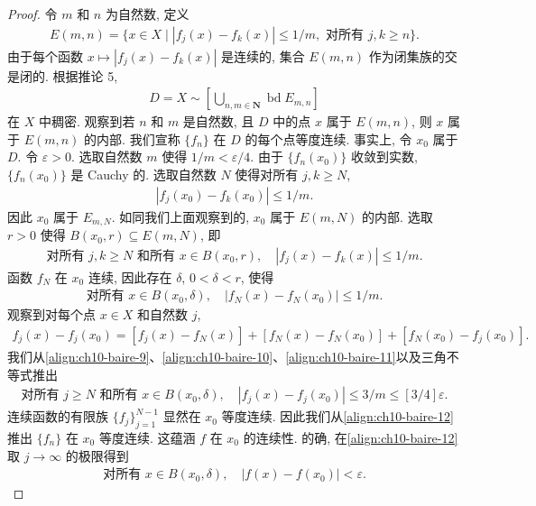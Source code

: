 \documentclass[../../main.tex]{subfiles}
\begin{document}
\begin{proof}
令 $m$ 和 $n$ 为自然数, 定义
\begin{align*}
E(m,n)=\{x\in X\mid|f_{j}(x)-f_{k}(x)|\leqslant 1/m,\text{ 对所有 }j,k\geqslant n\}.
\end{align*}
由于每个函数 $x\mapsto|f_{j}(x)-f_{k}(x)|$ 是连续的, 集合 $E(m,n)$ 作为闭集族的交是闭的. 根据推论 5,
\begin{align*}
D=X\sim\left[\bigcup_{n,m\in\mathbf{N}}\operatorname{bd}E_{m,n}\right]
\end{align*}
在 $X$ 中稠密. 观察到若 $n$ 和 $m$ 是自然数, 且 $D$ 中的点 $x$ 属于 $E(m,n)$, 则 $x$ 属于 $E(m,n)$ 的内部. 我们宣称 $\{f_{n}\}$ 在 $D$ 的每个点等度连续. 事实上, 令 $x_{0}$ 属于 $D$. 令 $\varepsilon>0$. 选取自然数 $m$ 使得 $1/m<\varepsilon/4$. 由于 $\{f_{n}(x_{0})\}$ 收敛到实数, $\{f_{n}(x_{0})\}$ 是 Cauchy 的. 选取自然数 $N$ 使得对所有 $j,k\geqslant N$,
\begin{align}
|f_{j}(x_{0})-f_{k}(x_{0})|\leqslant 1/m.\label{align:ch10-baire-9}
\end{align}
因此 $x_{0}$ 属于 $E_{m,N}$. 如同我们上面观察到的, $x_{0}$ 属于 $E(m,N)$ 的内部. 选取 $r>0$ 使得 $B(x_{0},r)\subseteq E(m,N)$, 即
\begin{align}
\text{对所有 }j,k\geqslant N\text{ 和所有 }x\in B(x_{0},r),\quad|f_{j}(x)-f_{k}(x)|\leqslant 1/m.\label{align:ch10-baire-10}
\end{align}
函数 $f_{N}$ 在 $x_{0}$ 连续, 因此存在 $\delta$, $0<\delta<r$, 使得
\begin{align}
\text{对所有 }x\in B(x_{0},\delta),\quad|f_{N}(x)-f_{N}(x_{0})|\leqslant 1/m.\label{align:ch10-baire-11}
\end{align}
观察到对每个点 $x\in X$ 和自然数 $j$,
\begin{align*}
f_{j}(x)-f_{j}(x_{0})=[f_{j}(x)-f_{N}(x)]+[f_{N}(x)-f_{N}(x_{0})]+[f_{N}(x_{0})-f_{j}(x_{0})].
\end{align*}
我们从\eqref{align:ch10-baire-9}、\eqref{align:ch10-baire-10}、\eqref{align:ch10-baire-11}以及三角不等式推出
\begin{align}
\text{对所有 }j\geqslant N\text{ 和所有 }x\in B(x_{0},\delta),\quad|f_{j}(x)-f_{j}(x_{0})|\leqslant 3/m\leqslant[3/4]\varepsilon.\label{align:ch10-baire-12}
\end{align}
连续函数的有限族 $\{f_{j}\}_{j=1}^{N-1}$ 显然在 $x_{0}$ 等度连续. 因此我们从\eqref{align:ch10-baire-12}推出 $\{f_{n}\}$ 在 $x_{0}$ 等度连续. 这蕴涵 $f$ 在 $x_{0}$ 的连续性. 的确, 在\eqref{align:ch10-baire-12}取 $j\to\infty$ 的极限得到
\begin{align}
\text{对所有 }x\in B(x_{0},\delta),\quad|f(x)-f(x_{0})|<\varepsilon.\label{align:ch10-baire-13}
\end{align}
\end{proof}
\end{document}
